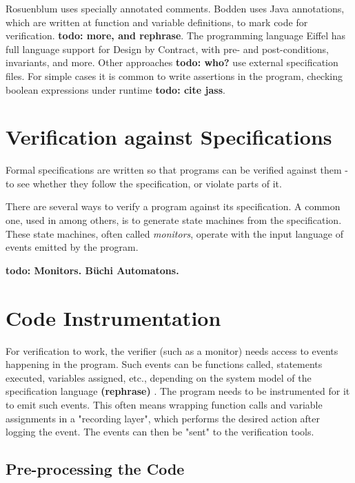 \documentclass[a4paper,11pt]{kth-mag}
\newcommand{\todo}[1]{\textbf{todo: #1}}
\newcommand{\rephrase}{\textbf{(rephrase)} }
\begin{document}
Rosuenblum \cite{rosenblum95practicalassertions} uses specially annotated
comments. Bodden \cite{bodden05efficientrv} uses Java annotations, which are
written at function and variable definitions, to mark code for verification.
\todo{more, and rephrase}. The programming language Eiffel has full language
support for Design by Contract, with pre- and post-conditions, invariants, and
more. Other approaches \todo{who?} use external specification files. For simple
cases it is common to write assertions in the program, checking boolean
expressions under runtime \todo{cite jass}.


\section{Verification against Specifications} \label{section-verification}

Formal specifications are written so that programs can be verified against them
- to see whether they follow the specification, or violate parts of it.

There are several ways to verify a program against its specification. A common
one, used in \cite{bauer06monitoring,bodden05efficientrv} among others, is to
generate state machines from the specification. These state machines, often
called \textit{monitors}, operate with the input language of events emitted by
the program.

\todo{Monitors. Büchi Automatons.}


\section{Code Instrumentation} \label{section-instrumentation}

For verification to work, the verifier (such as a monitor) needs access to
events happening in the program. Such events can be functions called,
statements executed, variables assigned, etc., depending on the system model of
the specification language \rephrase. The program needs to be instrumented for
it to emit such events. This often means wrapping function calls and variable
assignments in a "recording layer", which performs the desired action after
logging the event. The events can then be "sent" to the verification tools.


\subsection{Pre-processing the Code}
\end{document}
